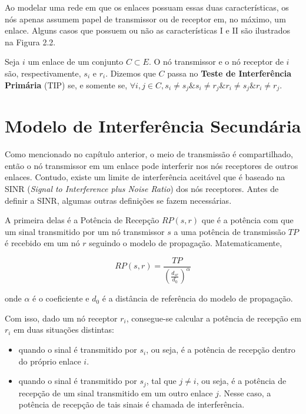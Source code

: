 Ao modelar uma rede em que os enlaces possuam essas duas características, os nós apenas assumem papel de transmissor ou de receptor em, no máximo, um enlace. Alguns casos que possuem ou não as características I e II são ilustrados na Figura 2.2.



Seja $i$ um enlace de um conjunto $C \subset E$. O nó transmissor e o nó receptor de $i$ são, respectivamente, $s_{i}$ e $r_{i}$. Dizemos que $C$ passa no {\bf Teste de Interferência Primária} (TIP) se, e somente se, $\forall i,j \in C, s_{i} \neq s_{j} \& s_{i} \neq r_{j} \& r_{i} \neq s_{j} \& r_{i} \neq r_{j}$. 

\section{Modelo de Interferência Secundária}

Como mencionado no capítulo anterior, o meio de transmissão é compartilhado, então o nó transmissor em um enlace pode interferir nos nós receptores de outros enlaces. Contudo, existe um limite de interferência aceitável que é baseado na SINR ({\it Signal to Interference plus Noise Ratio})   dos nós receptores. Antes de definir a SINR, algumas outras definições se fazem necessárias.

A primeira delas é a Potência de Recepção $RP(s,r)$ que é a potência com que um sinal transmitido por um nó transmissor $s$ a uma potência de transmissão $TP$ é recebido em um nó $r$ seguindo o modelo de propagação. Matematicamente,

\begin{equation}
RP(s,r) = \frac{TP}{(\frac{d_{sr}}{d_{0}})^{\alpha}}
\end{equation}


onde $\alpha$ é o coeficiente e $d_{0}$ é a distância de referência do modelo de propagação.

Com isso, dado um nó receptor $r_{i}$, consegue-se calcular a potência de recepção em $r_{i}$ em duas situações distintas:

\begin{itemize}

\item quando o sinal é transmitido por $s_{i}$, ou seja, é a potência de recepção dentro do próprio enlace $i$. 
\item quando o sinal é transmitido por $s_{j}$, tal que $j \neq i$, ou seja, é a potência de recepção de um sinal transmitido em um outro enlace $j$. Nesse caso, a potência de recepção de tais sinais é chamada de interferência. 

\end{itemize}

